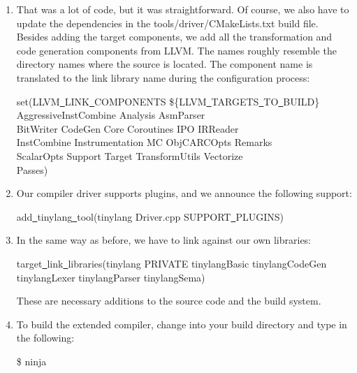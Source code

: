 \begin{enumerate}
\item That was a lot of code, but it was straightforward. Of course, we also have to update the dependencies in the tools/driver/CMakeLists.txt build file. Besides adding the target components, we add all the transformation and code generation components from LLVM. The names roughly resemble the directory names where the source is located. The component name is translated to the link library name during the configuration process:
\begin{tcolorbox}[colback=white,colframe=black]
set(LLVM\underline{~}LINK\underline{~}COMPONENTS \$\{LLVM\underline{~}TARGETS\underline{~}TO\underline{~}BUILD\} \\
\hspace*{0.5cm}AggressiveInstCombine Analysis AsmParser \\
\hspace*{0.5cm}BitWriter CodeGen Core Coroutines IPO IRReader \\
\hspace*{0.5cm}InstCombine Instrumentation MC ObjCARCOpts Remarks \\
\hspace*{0.5cm}ScalarOpts Support Target TransformUtils Vectorize \\
\hspace*{0.5cm}Passes)
\end{tcolorbox}

\item Our compiler driver supports plugins, and we announce the following support:
\begin{tcolorbox}[colback=white,colframe=black]
add\underline{~}tinylang\underline{~}tool(tinylang Driver.cpp SUPPORT\underline{~}PLUGINS)
\end{tcolorbox}

\item In the same way as before, we have to link against our own libraries:
\begin{tcolorbox}[colback=white,colframe=black]
target\underline{~}link\underline{~}libraries(tinylang
\hspace*{0.5cm}PRIVATE tinylangBasic tinylangCodeGen
\hspace*{0.5cm}tinylangLexer tinylangParser tinylangSema)
\end{tcolorbox}
These are necessary additions to the source code and the build system.

\item To build the extended compiler, change into your build directory and type in the following:
\begin{tcolorbox}[colback=white,colframe=black]
\$ ninja
\end{tcolorbox}
\end{enumerate}

